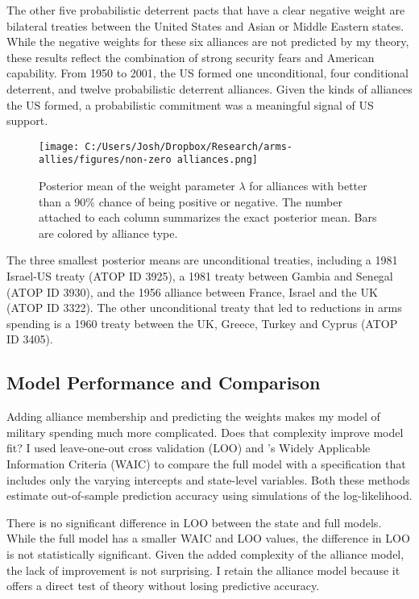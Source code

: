 \documentclass[12pt]{article}
\begin{document}
The other five probabilistic deterrent pacts that have a clear negative weight are bilateral treaties between the United States and Asian or Middle Eastern states. While the negative weights for these six alliances are not predicted by my theory, these results reflect the combination of strong security fears and American capability. From 1950 to 2001, the US formed one unconditional, four conditional deterrent, and twelve probabilistic deterrent alliances. Given the kinds of alliances the US formed, a probabilistic commitment was a meaningful signal of US support. 

\begin{figure}[htbp]
	\centering
		\texttt{[image: C:/Users/Josh/Dropbox/Research/arms-allies/figures/non-zero alliances.png]}
	\caption{Posterior mean of the weight parameter $\lambda$ for alliances with better than a 90\% chance of being positive or negative. The number attached to each column summarizes the exact posterior mean. Bars are colored by alliance type.}
	\label{fig:non-zero alliances}
\end{figure}

The three smallest posterior means are unconditional treaties, including a 1981 Israel-US treaty (ATOP ID 3925), a 1981 treaty between Gambia and Senegal (ATOP ID 3930),  and the 1956 alliance between France, Israel and the UK (ATOP ID 3322). The other unconditional treaty that led to reductions in arms spending is a 1960 treaty between the UK, Greece, Turkey and Cyprus (ATOP ID 3405). 


\subsection*{Model Performance and Comparison}

Adding alliance membership and predicting the weights makes my model of military spending much more complicated. Does that complexity improve model fit? I used leave-one-out cross validation (LOO) \citep{Vehtarietal2017} and \citet{Watanabe2010}'s Widely Applicable Information Criteria (WAIC) to compare the full model with a specification that includes only the varying intercepts and state-level variables. Both these methods estimate out-of-sample prediction accuracy using simulations of the log-likelihood. 

There is no significant difference in LOO between the state and full models. While the full model has a smaller WAIC and LOO values, the difference in LOO is not statistically significant. Given the added complexity of the alliance model, the lack of improvement is not surprising. I retain the alliance model because it offers a direct test of theory without losing predictive accuracy. 
\end{document}
